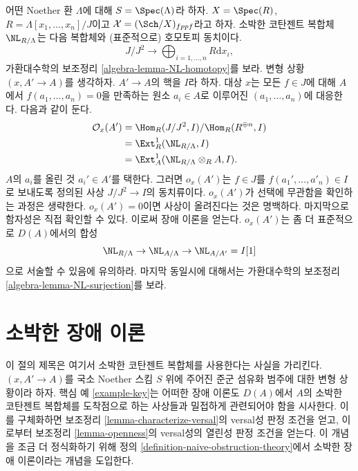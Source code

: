 \begin{example}[핵심 예]
\label{example-key}
어떤 Noether 환 $\Lambda$에 대해 $S = \Spec(\Lambda)$라 하자.
$X = \Spec(R)$, $R = \Lambda[x_1, \ldots, x_n]/J$이고
$\mathcal{X} = (\Sch/X)_{fppf}$라고 하자.
소박한 코탄젠트 복합체 $\NL_{R/\Lambda}$는 다음 복합체와
(표준적으로) 호모토피 동치이다.
$$
J/J^2
\longrightarrow
\bigoplus\nolimits_{i = 1, \ldots, n} R\text{d}x_i,
$$
가환대수학의 보조정리 \ref{algebra-lemma-NL-homotopy}를 보라.
변형 상황 $(x, A' \to A)$를 생각하자.
$A' \to A$의 핵을 $I$라 하자. 대상 $x$는 모든 $f \in J$에 대해
$A$에서 $f(a_1, \ldots, a_n) = 0$을 만족하는 원소 $a_i \in A$로
이루어진 $(a_1, \ldots, a_n)$에 대응한다. 다음과 같이 둔다.
\begin{align*}
\mathcal{O}_x(A')
& =
\Hom_R(J/J^2, I)/\Hom_R(R^{\oplus n}, I) \\
& =
\Ext^1_R(\NL_{R/\Lambda}, I) \\
& =
\Ext^1_A(\NL_{R/\Lambda} \otimes_R A, I).
\end{align*}
$A$의 $a_i$를 올린 것 $a_i' \in A'$를 택한다.
그러면 $o_x(A')$는 $f \in J$를 $f(a_1', \ldots, a'_n) \in I$로 보내도록
정의된 사상 $J/J^2 \to I$의 동치류이다.
$o_x(A')$가 선택에 무관함을 확인하는 과정은 생략한다.
$o_x(A') = 0$이면 사상이 올려진다는 것은 명백하다.
마지막으로 함자성은 직접 확인할 수 있다. 이로써 장애 이론을 얻는다.
$o_x(A')$는 좀 더 표준적으로 $D(A)$에서의 합성
$$
\NL_{R/\Lambda} \to \NL_{A/\Lambda} \to \NL_{A/A'} = I[1]
$$
으로 서술할 수 있음에 유의하라. 마지막 동일시에 대해서는
가환대수학의 보조정리 \ref{algebra-lemma-NL-surjection}를 보라.
\end{example}









\section{소박한 장애 이론}
\label{section-naive-obstruction-theory}

\noindent
이 절의 제목은 여기서 소박한 코탄젠트 복합체를 사용한다는 사실을
가리킨다. $(x, A' \to A)$를 국소 Noether 스킴 $S$ 위에 주어진
준군 섬유화 범주에 대한 변형 상황이라 하자.
핵심 예 \ref{example-key}는 어떠한 장애 이론도 $D(A)$에서 $A$의
소박한 코탄젠트 복합체를 도착점으로 하는 사상들과 밀접하게 관련되어야
함을 시사한다. 이를 구체화하면 보조정리 \ref{lemma-characterize-versal}의
versal성 판정 조건을 얻고, 이로부터 보조정리 \ref{lemma-openness}의
versal성의 열린성 판정 조건을 얻는다.
이 개념을 조금 더 정식화하기 위해
정의 \ref{definition-naive-obstruction-theory}에서 소박한 장애 이론이라는
개념을 도입한다.

